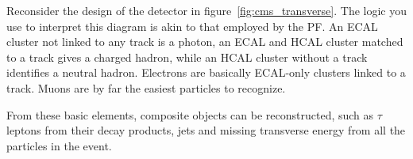Reconsider the design of the detector in figure~\ref{fig:cms_transverse}. The logic you use to
interpret this diagram is akin to that employed by the PF.
An ECAL cluster not linked to any track is a photon, an ECAL and HCAL cluster matched to a track gives a charged hadron, while an HCAL cluster without a track identifies a neutral hadron. Electrons are basically ECAL-only clusters linked to a track. Muons are by far the easiest particles to recognize.

From these basic elements, composite objects can be reconstructed, such as
$\tau$ leptons from their decay products, jets and
missing transverse energy from all the particles in the event.
